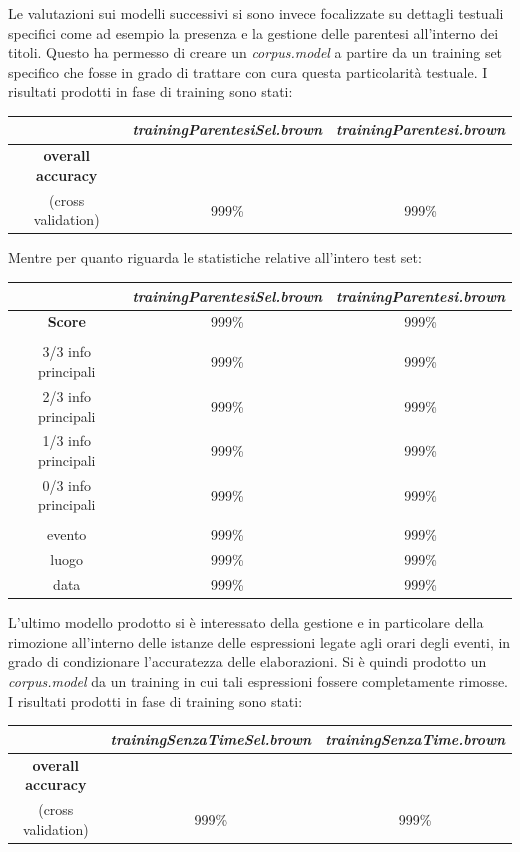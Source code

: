 \documentclass[a4paper]{report}
\begin{document}
Le valutazioni sui modelli successivi si sono invece focalizzate su dettagli testuali specifici come ad esempio la presenza e la gestione delle parentesi all'interno dei titoli. Questo ha permesso di creare un \textit{corpus.model} a partire da un training set specifico che fosse in grado di trattare con cura questa particolarità testuale. I risultati prodotti in fase di training sono stati: 
\begin{center}
\begin{tabular}{c c c}
\hline
 & \textit{trainingParentesiSel.brown} & \textit{trainingParentesi.brown}\\
\hline
\textbf{overall accuracy} \\ (cross validation) & 999\% & 999\% \\
\hline
\end{tabular}
\end{center}
Mentre per quanto riguarda le statistiche relative all'intero test set:
\begin{center}
\begin{tabular}{|ccc|}
\hline
 & \textit{trainingParentesiSel.brown} & \textit{trainingParentesi.brown}\\
\hline
\textbf{Score} & 999\% & 999\% \\
\hline
 & &  \\
\hline
3/3 info principali & 999\% & 999\% \\
2/3 info principali & 999\% & 999\% \\
1/3 info principali & 999\% & 999\% \\
0/3 info principali & 999\% & 999\% \\
\hline
 & &  \\
\hline
evento & 999\% & 999\% \\
luogo & 999\% & 999\% \\
data & 999\% & 999\% \\
\hline
\end{tabular}
\end{center}
L'ultimo modello prodotto si è interessato della gestione e in particolare della rimozione all'interno delle istanze delle espressioni legate agli orari degli eventi, in grado di condizionare l'accuratezza delle elaborazioni. Si è quindi prodotto un \textit{corpus.model} da un training in cui tali espressioni fossere completamente rimosse. I risultati prodotti in fase di training sono stati:
\begin{center}
\begin{tabular}{c c c}
\hline
 & \textit{trainingSenzaTimeSel.brown} & \textit{trainingSenzaTime.brown}\\
\hline
\textbf{overall accuracy} \\ (cross validation) & 999\% & 999\% \\
\hline
\end{tabular}
\end{center}
\end{document}
